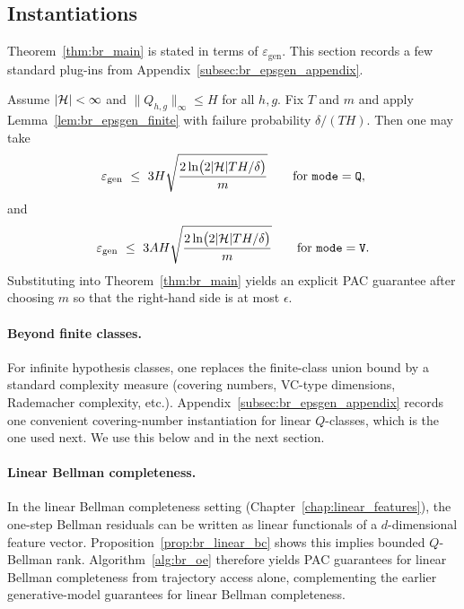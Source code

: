 \subsection{Instantiations}
\label{subsec:br_instantiations}

Theorem~\ref{thm:br_main} is stated in terms of $\varepsilon_{\mathrm{gen}}$.
This section records a few standard plug-ins from Appendix~\ref{subsec:br_epsgen_appendix}.

\begin{corollary}
\label{cor:br_finite_inst}
Assume $|\mathcal{H}|<\infty$ and $\|Q_{h,g}\|_\infty\le H$ for all $h,g$.
Fix $T$ and $m$ and apply Lemma~\ref{lem:br_epsgen_finite} with failure probability $\delta/(TH)$.
Then one may take
\[
\varepsilon_{\mathrm{gen}}
\ \le\
3H\sqrt{\frac{2\ln\!\big(2|\mathcal{H}|TH/\delta\big)}{m}}
\qquad\text{for $\mathtt{mode}=\mathtt{Q}$},
\]
and
\[
\varepsilon_{\mathrm{gen}}
\ \le\
3AH\sqrt{\frac{2\ln\!\big(2|\mathcal{H}|TH/\delta\big)}{m}}
\qquad\text{for $\mathtt{mode}=\mathtt{V}$}.
\]
Substituting into Theorem~\ref{thm:br_main} yields an explicit PAC guarantee after choosing $m$ so that
the right-hand side is at most $\epsilon$.
\end{corollary}

\paragraph{Beyond finite classes.}
For infinite hypothesis classes, one replaces the finite-class union bound by a standard complexity
measure (covering numbers, VC-type dimensions, Rademacher complexity, etc.).
Appendix~\ref{subsec:br_epsgen_appendix} records one convenient covering-number instantiation for
linear $Q$-classes, which is the one used next. We use this below and
in the next section.

\paragraph{Linear Bellman completeness.}
In the linear Bellman completeness setting (Chapter~\ref{chap:linear_features}), the one-step
Bellman residuals can be written as linear functionals of a $d$-dimensional feature vector.
Proposition~\ref{prop:br_linear_bc} shows this implies bounded $Q$-Bellman rank.
Algorithm~\ref{alg:br_oe} therefore yields PAC guarantees for linear Bellman completeness from
trajectory access alone, complementing the earlier generative-model guarantees for linear Bellman
completeness.

